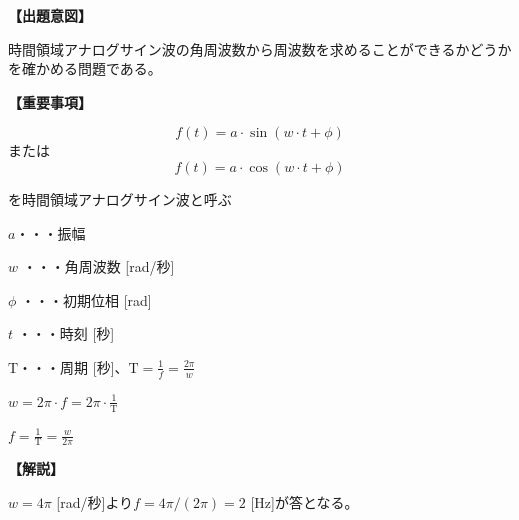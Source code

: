 \noindent \textbf{【出題意図】}

\noindent 時間領域アナログサイン波の角周波数から周波数を求めることができるかどうかを確かめる問題である。

\vspace{1em}
\noindent \textbf{【重要事項】}

\[
f(t) = a \cdot \sin( w \cdot t + \phi )
\]
%
\noindent または
%
\[
f(t) = a \cdot \cos( w \cdot t + \phi )
\]

\medskip
\noindent を時間領域アナログサイン波と呼ぶ

\bigskip
\noindent $a$・・・振幅

\bigskip
\noindent $w$ ・・・角周波数 [rad/秒]

\bigskip
\noindent $\phi$ ・・・初期位相 [rad]

\bigskip
\noindent $t$ ・・・時刻 [秒]

\bigskip
$\textrm{T}$・・・周期 [秒]、$\textrm{T} = \frac{1}{f} = \frac{2\pi}{w}$

\bigskip
$w = 2\pi \cdot f = 2 \pi \cdot \frac{1}{\textrm{T}}$

\bigskip
$f = \frac{1}{\textrm{T}} = \frac{w}{2\pi}$

\vspace{1em}
\noindent \textbf{【解説】}

\noindent $w = 4\pi$ [rad/秒]より$f = 4\pi / (2\pi) = 2$ [Hz]が答となる。
